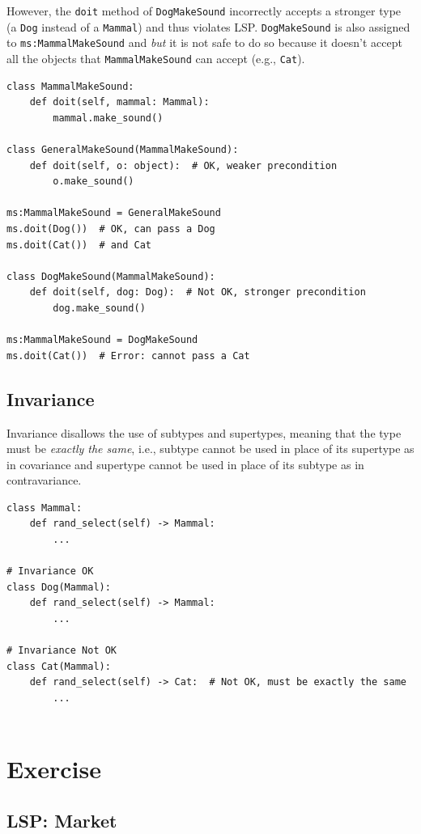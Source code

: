 \documentclass[oneside,11pt,dvipsnames]{book}
\newcommand{\code}[1]{\texttt{#1}}
\begin{document}
However, the \code{doit} method of \code{DogMakeSound} incorrectly accepts a stronger type (a \code{Dog} instead of a \code{Mammal}) and thus violates LSP. \code{DogMakeSound} is also assigned to \code{ms:MammalMakeSound} and \emph{but} it is not safe to do so because it doesn't accept all the objects that \code{MammalMakeSound} can accept (e.g., \code{Cat}).

\begin{lstlisting}
class MammalMakeSound:
    def doit(self, mammal: Mammal):
        mammal.make_sound()

class GeneralMakeSound(MammalMakeSound):
    def doit(self, o: object):  # OK, weaker precondition
        o.make_sound()

ms:MammalMakeSound = GeneralMakeSound
ms.doit(Dog())  # OK, can pass a Dog
ms.doit(Cat())  # and Cat
                
class DogMakeSound(MammalMakeSound):
    def doit(self, dog: Dog):  # Not OK, stronger precondition
        dog.make_sound()  

ms:MammalMakeSound = DogMakeSound
ms.doit(Cat())  # Error: cannot pass a Cat
\end{lstlisting}    

\subsection{Invariance}

Invariance disallows the use of subtypes and supertypes, meaning that the type must be \emph{exactly the same}, i.e., subtype cannot be used in place of its supertype as in covariance and supertype cannot be used in place of its subtype as in contravariance.


\begin{lstlisting}
class Mammal:
    def rand_select(self) -> Mammal:
        ...
       
# Invariance OK
class Dog(Mammal):    
    def rand_select(self) -> Mammal:
        ...

# Invariance Not OK 
class Cat(Mammal):    
    def rand_select(self) -> Cat:  # Not OK, must be exactly the same
        ...        


\end{lstlisting}

\section{Exercise}
\subsection{LSP: Market}\label{exercise:market}
\end{document}
